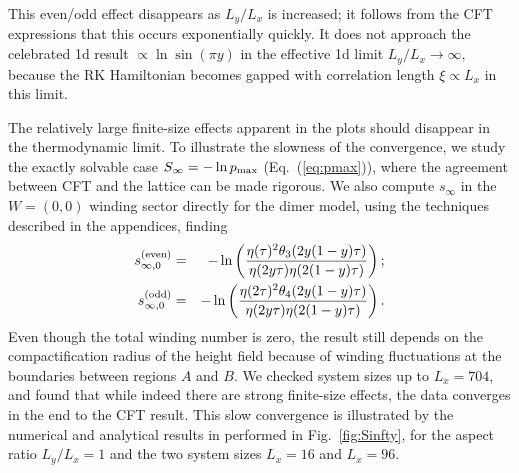 \documentclass[11pt]{iopart}
\begin{document}
This even/odd effect disappears as $L_y/L_x$ is increased; it follows from the CFT expressions that this occurs exponentially quickly.  It does not approach the celebrated 1d result\cite{Cardy} $\propto \ln\sin (\pi y)$ in the effective 1d limit $L_y/L_x\to\infty$, because the RK Hamiltonian becomes gapped with correlation length $\xi\propto L_x$ in this limit. 




The relatively large finite-size effects apparent in the plots should disappear in the thermodynamic limit.  To illustrate the slowness of the convergence, we study the exactly solvable case $S_\infty=-\ln p_{\rm max}$ (Eq.~(\ref{eq:pmax})), where the agreement between CFT and the lattice can be made rigorous. 
We also compute $s_\infty$ in the $W=(0,0)$ winding sector directly for the dimer model, using the techniques described in the appendices, finding
\begin{eqnarray}\label{eq:cft_w0}
 s_{\infty,0}^{\rm (even)}&=&-\ln \left(\frac{\eta(\tau)^2\theta_3(2y(1-y)\tau)}{\eta(2y\tau)\eta(2(1-y)\tau)}\right);\\\label{eq:cft_w0_odd}
 s_{\infty,0}^{\rm (odd)}&=&-\ln \left(\frac{\eta(2\tau)^2\theta_4(2y(1-y)\tau)}{\eta(2y\tau)\eta(2(1-y)\tau)}\right).
\end{eqnarray}
Even though the total winding number is zero, the result still depends on the compactification radius of the height field  because of winding fluctuations at the boundaries between regions $A$ and $B$. 
We checked system sizes up to $L_x=704$, and found that while indeed there are strong finite-size effects, the data converges in the end to the CFT result. 
This slow convergence is illustrated by the numerical and analytical results in performed in Fig.~\ref{fig:Sinfty}, for the aspect ratio $L_y/L_x=1$ and the two system sizes $L_x=16$ and $L_x=96$. 
\end{document}
